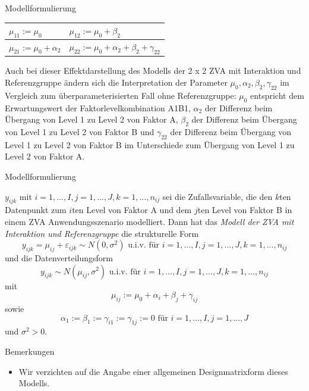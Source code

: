 \documentclass[
  8pt,
  ignorenonframetext,
]{beamer}
\providecommand{\tightlist}{%
  \setlength{\itemsep}{0pt}\setlength{\parskip}{0pt}}
\begin{document}
\begin{frame}{Modellformulierung}
\begin{center}
\begin{tabular}{l|l}
$\mu_{11} := \mu_0$            & $\mu_{12} := \mu_0 + \beta_2$                          \\\hline
$\mu_{21} := \mu_0 + \alpha_2$ & $\mu_{22} := \mu_0 + \alpha_2 + \beta_2 + \gamma_{22}$ \\
\end{tabular}
\end{center}

Auch bei dieser Effektdarstellung des Modells der 2 x 2 ZVA mit
Interaktion und Referenzgruppe ändern sich die Interpretation der
Parameter \(\mu_0,\alpha_2,\beta_2,\gamma_{22}\) im Vergleich zum
überparameterisierten Fall ohne Referenzgruppe: \(\mu_0\) entspricht dem
Erwartungswert der Faktorlevelkombination A1B1, \(\alpha_2\) der
Differenz beim Übergang von Level 1 zu Level 2 von Faktor A, \(\beta_2\)
der Differenz beim Übergang von Level 1 zu Level 2 von Faktor B und
\(\gamma_{22}\) der Differenz beim Übergang von Level 1 zu Level 2 von
Faktor B im Unterschiede zum Übergang von Level 1 zu Level 2 von Faktor
A.
\end{frame}

\begin{frame}{Modellformulierung}
\protect\hypertarget{modellformulierung-6}{}
\footnotesize
\begin{definition}
\justifying
$y_{ijk}$ mit $i = 1,...,I, j = 1,...,J, k = 1,...,n_{ij}$ sei die Zufallsvariable,
die den $k$ten Datenpunkt zum $i$ten Level von Faktor A und dem $j$ten Level von
Faktor B in einem ZVA Anwendungsszenario modelliert. Dann hat das
\textit{Modell der ZVA mit Interaktion und Referenzgruppe} die strukturelle Form
\begin{equation}
y_{ijk} = \mu_{ij} + \varepsilon_{ijk} \sim N(0,\sigma^2)
\mbox{ u.i.v. für } i = 1,...,I, j = 1,...,J, k = 1,...,n_{ij}
\end{equation}
und die Datenverteilungsform
\begin{equation}
y_{ijk} \sim N(\mu_{ij}, \sigma^2) \mbox{ u.i.v. für } i = 1,...,I, j = 1,...,J, k = 1,...,n_{ij}
\end{equation}
mit
\begin{equation}
\mu_{ij} := \mu_0 + \alpha_i + \beta_j + \gamma_{ij}
\end{equation}
sowie
\begin{equation}
\alpha_1 := \beta_1 := \gamma_{i1} := \gamma_{1j} :=0 \mbox{ für } i = 1,...,I, j = 1,...,J
\end{equation}
und $\sigma^2 > 0$.
\end{definition}

Bemerkungen

\begin{itemize}
\tightlist
\item
  Wir verzichten auf die Angabe einer allgemeinen Designmatrixform
  dieses Modells.
\end{itemize}
\end{frame}
\end{document}
